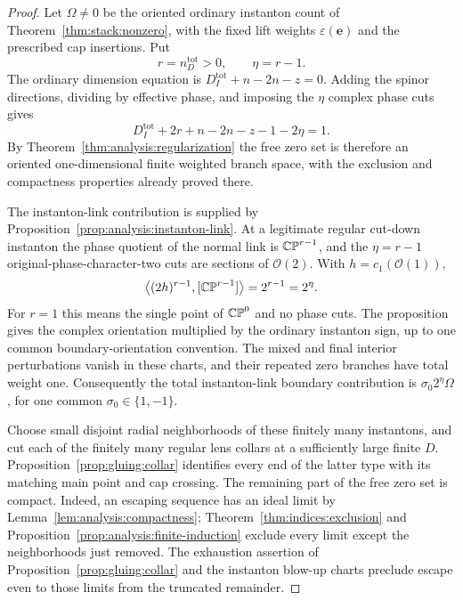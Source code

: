 \begin{proof}
Let $\Omega\ne0$ be the oriented ordinary instanton count of
Theorem~\ref{thm:stack:nonzero}, with the fixed lift weights
$\varepsilon(\mathbf e)$ and the prescribed cap insertions.
Put
\[
 r=n_D^{\mathrm{tot}}>0,\qquad \eta=r-1.
\]
The ordinary dimension equation is
$D_I^{\mathrm{tot}}+n-2n-z=0$.  Adding the spinor directions,
dividing by effective phase, and imposing the $\eta$ complex
phase cuts gives
\begin{equation}
 D_I^{\mathrm{tot}}+2r+n-2n-z-1-2\eta=1.
 \label{eq:gluing:one-dimensional}
\end{equation}
By Theorem~\ref{thm:analysis:regularization} the free zero set
is therefore an oriented one-dimensional finite weighted
branch space, with the exclusion and compactness properties
already proved there.

The instanton-link contribution is supplied by
Proposition~\ref{prop:analysis:instanton-link}.  At a legitimate
regular cut-down instanton the phase quotient of the normal link is
$\mathbb{CP}^{r-1}$, and the $\eta=r-1$ original-phase-character-two cuts
are sections of $\mathcal O(2)$.  With $h=c_1(\mathcal O(1))$,
\begin{equation}
 \left\langle(2h)^{r-1},[\mathbb{CP}^{r-1}]\right\rangle
 =2^{r-1}=2^\eta.
 \label{eq:gluing:link-multiplicity}
\end{equation}
For $r=1$ this means the single point of $\mathbb{CP}^0$ and no phase cuts.
The proposition gives the complex orientation multiplied by the ordinary
instanton sign, up to one common boundary-orientation convention.
The mixed and final interior perturbations vanish in these charts,
and their repeated zero branches have total weight one.
Consequently the total instanton-link boundary contribution is
$\sigma_0 2^\eta\Omega$, for one common
$\sigma_0\in\{1,-1\}$.

Choose small disjoint radial neighborhoods of these finitely
many instantons, and cut each of the finitely many regular lens
collars at a sufficiently large finite $D$.
Proposition~\ref{prop:gluing:collar} identifies every end of the
latter type with its matching main point and cap crossing.
The remaining part of the free zero set is compact.  Indeed,
an escaping sequence has an ideal limit by
Lemma~\ref{lem:analysis:compactness};
Theorem~\ref{thm:indices:exclusion} and
Proposition~\ref{prop:analysis:finite-induction} exclude every
limit except the neighborhoods just removed.  The exhaustion
assertion of Proposition~\ref{prop:gluing:collar} and the instanton
blow-up charts preclude escape even to those limits from the
truncated remainder.


\end{proof}
